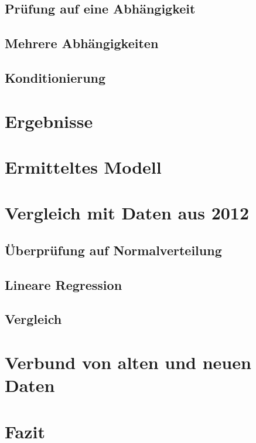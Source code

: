 \subsection{Prüfung auf eine Abhängigkeit}
\subsection{Mehrere Abhängigkeiten}
\subsection{Konditionierung}

\section{Ergebnisse}
\section{Ermitteltes Modell}

\section{Vergleich mit Daten aus 2012}
\subsection{Überprüfung auf Normalverteilung}
\subsection{Lineare Regression}
\subsection{Vergleich}

\section{Verbund von alten und neuen Daten}

\section{Fazit}

